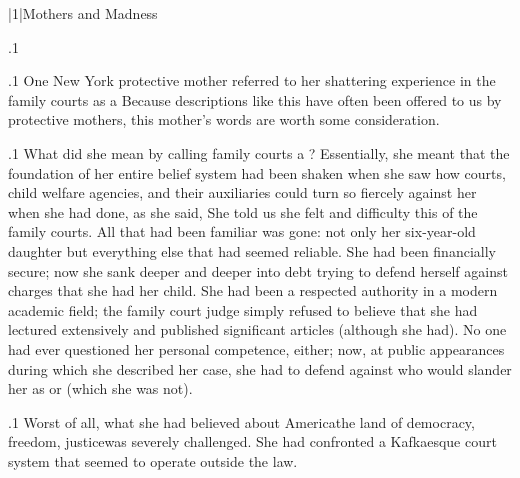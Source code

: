 \documentclass[11pt, twoside]{article}
\begin{document}
\thispagestyle{empty}

{\fontsize{13}{19}\selectfont


\hspace{-5em}\begin{minipage}{1.1\textwidth}
\begin{flushright}
{\fontsize{14}{22}\selectfont
\textbf{%
}
}
\end{flushright}
\end{minipage}


\vspace{6em}





\s|1|{Mothers and Madness}

\p.1{%
\writeS{}
}%

\p.1{%
\noindent{}One New York protective mother referred to her shattering experience
in the family courts as a  Because descriptions like
this have often been offered to us by protective mothers, this mother’s
words are worth some consideration.
}%

\p.1{%
What did she mean by calling family courts a ?
Essentially, she meant that the foundation of her entire belief system
had been shaken when she saw how courts, child welfare agencies, and
their auxiliaries could turn so fiercely against her when she had done, as
she said,  She told us she felt  and difficulty  this  of the family courts.
All that had been familiar was gone: not only her six-year-old daughter
but everything else that had seemed reliable. She had been financially
secure; now she sank deeper and deeper into debt trying to defend herself against charges that she had  her child. She had been
a respected authority in a modern academic field; the family court judge
simply refused to believe that she had lectured extensively and published
significant articles (although she had). No one had ever questioned her
personal competence, either; now, at public appearances during which
she described her case, she had to defend against  who would
slander her as  or  (which she was
not).
}%

\p.1{%
Worst of all, what she had believed about America\mdash{}the land of
democracy, freedom, justice\mdash{}was severely challenged. She had confronted a Kafkaesque court system that seemed to operate outside the
law.
}%

}
\end{document}
